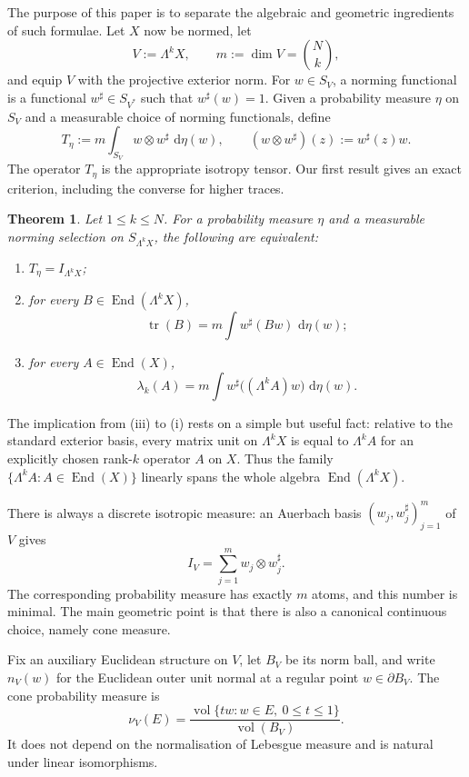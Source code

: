 \documentclass[11pt,a4paper]{amsart}
\numberwithin{equation}{section}
\theoremstyle{plain}
\newtheorem{maintheorem}{Theorem}
\theoremstyle{definition}
\theoremstyle{remark}
\DeclareMathOperator{\End}{End}
\DeclareMathOperator{\tr}{tr}
\DeclareMathOperator{\vol}{vol}
\newcommand{\dd}{\,\mathrm{d}}
\newcommand{\Id}{I}
\begin{document}
The purpose of this paper is to separate the algebraic and geometric ingredients of such formulae. Let $X$ now be normed, let
\[
V:=\Lambda^kX,
\qquad
m:=\dim V=\binom Nk,
\]
and equip $V$ with the projective exterior norm. For $w\in S_V$, a norming functional is a functional $w^\sharp\in S_{V^*}$ such that $w^\sharp(w)=1$. Given a probability measure $\eta$ on $S_V$ and a measurable choice of norming functionals, define
\begin{equation}\label{eq:T-intro}
T_\eta:=m\int_{S_V}w\otimes w^\sharp\,\dd\eta(w),
\qquad
(w\otimes w^\sharp)(z):=w^\sharp(z)w.
\end{equation}
The operator $T_\eta$ is the appropriate isotropy tensor. Our first result gives an exact criterion, including the converse for higher traces.

\begin{maintheorem}\label{thm:intro-A}
Let $1\leqslant k\leqslant N$. For a probability measure $\eta$ and a measurable norming selection on $S_{\Lambda^kX}$, the following are equivalent:
\begin{enumerate}[label=\textup{(\roman*)}]
\item $T_\eta=\Id_{\Lambda^kX}$;
\item for every $B\in\End(\Lambda^kX)$,
\[
\tr(B)=m\int w^\sharp(Bw)\,\dd\eta(w);
\]
\item for every $A\in\End(X)$,
\[
\lambda_k(A)=m\int w^\sharp\big((\Lambda^kA)w\big)\,\dd\eta(w).
\]
\end{enumerate}
\end{maintheorem}

The implication from (iii) to (i) rests on a simple but useful fact: relative to the standard exterior basis, every matrix unit on $\Lambda^kX$ is equal to $\Lambda^kA$ for an explicitly chosen rank-$k$ operator $A$ on $X$. Thus the family $\{\Lambda^kA:A\in\End(X)\}$ linearly spans the whole algebra $\End(\Lambda^kX)$.

There is always a discrete isotropic measure: an Auerbach basis $(w_j,w_j^\sharp)_{j=1}^m$ of $V$ gives
\[
\Id_V=\sum_{j=1}^m w_j\otimes w_j^\sharp.
\]
The corresponding probability measure has exactly $m$ atoms, and this number is minimal. The main geometric point is that there is also a canonical continuous choice, namely cone measure.

Fix an auxiliary Euclidean structure on $V$, let $B_V$ be its norm ball, and write $n_V(w)$ for the Euclidean outer unit normal at a regular point $w\in\partial B_V$. The cone probability measure is
\[
\nu_V(E)=\frac{\vol\{tw:w\in E,\ 0\leqslant t\leqslant1\}}{\vol(B_V)}.
\]
It does not depend on the normalisation of Lebesgue measure and is natural under linear isomorphisms.
\end{document}
